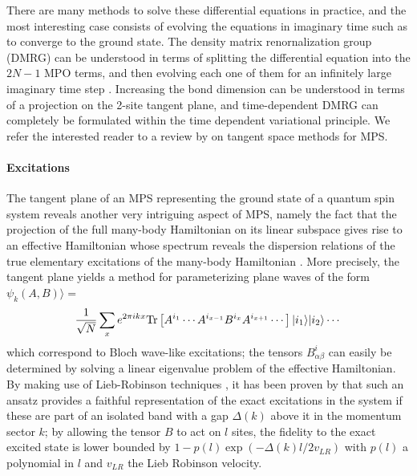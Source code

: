 \documentclass[rmp,aps,reprint,superscriptaddress,nobalancelastpage]{revtex4-1}
\begin{document}
There are many methods to solve these differential equations in practice, and the most interesting case consists of evolving the equations in imaginary time such as to converge to the ground state. The density matrix renornalization group (DMRG) \cite{white1993density} can be understood in terms of splitting the differential equation into the $2N-1$ MPO terms, and then evolving each one of them for an infinitely large imaginary time step \cite{haegeman2016unifying}. Increasing the bond dimension can be understood in terms of a projection on the 2-site tangent plane, and time-dependent DMRG can completely be formulated within the time dependent variational principle. We refer the interested reader to a review by  \citet{vanderstraeten2018tangent} on tangent space methods for MPS.

\paragraph{Excitations}

The tangent plane of an MPS representing the ground state of a quantum spin system reveals another very intriguing aspect of MPS, namely the fact that the projection of the full many-body Hamiltonian on its linear subspace gives rise to an effective Hamiltonian whose spectrum reveals the dispersion relations of the true elementary excitations of the many-body Hamiltonian \cite{rommer1997class,porras2006renormalization,pirvu2012matrix,haegeman:mps-ansatz-excitations}. More precisely, the tangent plane yields a method for parameterizing plane waves of the form
$\psi_k(A,B)\rangle=$
\[\frac{1}{\sqrt{N}}\sum_x e^{2\pi ikx}{\rm Tr}\left[A^{i_1}\cdots A^{i_{x-1}} B^{i_x} A^{i_{x+1}}\cdots\right]|i_1\rangle|i_2\rangle\cdots\]
which correspond to Bloch wave-like excitations; the tensors $B^i_{\alpha\beta}$ can easily be determined by solving a linear eigenvalue problem of the effective Hamiltonian.  By making use of Lieb-Robinson techniques \cite{nachtergaele2010lieb,bravyi2006lieb, hastings2004locality,hastings:gap-and-expdecay}, it has been proven by \citet{haegeman2013elementary} that such an ansatz provides a faithful representation of the exact excitations in the system if these are part of an isolated band with a gap $\Delta(k)$ above it in the momentum sector $k$; by allowing the tensor $B$ to act on $l$ sites, the fidelity to the exact excited state is lower bounded by $1-p(l)\exp\left(-\Delta(k)l/2v_{LR}\right)$ with $p(l)$ a polynomial in $l$ and $v_{LR}$ the Lieb Robinson velocity.
\end{document}

